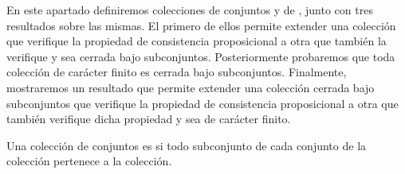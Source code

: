 %
\begin{isabellebody}%
%
%
\isadelimtheory
%
\endisadelimtheory
%
\isatagtheory
%
\endisatagtheory
{\isafoldtheory}%
%
\isadelimtheory
%
\endisadelimtheory
%
\begin{isamarkuptext}%
En este apartado definiremos colecciones de conjuntos  y de 
  , junto con tres resultados sobre las mismas. El primero de ellos permite
  extender una colección que verifique la propiedad de consistencia proposicional a otra que 
  también la verifique y sea cerrada bajo subconjuntos. Posteriormente probaremos que toda colección
  de carácter finito es cerrada bajo subconjuntos. Finalmente, mostraremos un resultado que 
  permite extender una colección cerrada bajo subconjuntos que verifique la propiedad de
  consistencia proposicional a otra que también verifique dicha propiedad y sea de carácter 
  finito.

  \begin{definicion}
    Una colección de conjuntos es  si todo subconjunto de cada conjunto 
    de la colección pertenece a la colección.
  \end{definicion}


\end{isamarkuptext}
\end{isabellebody}
